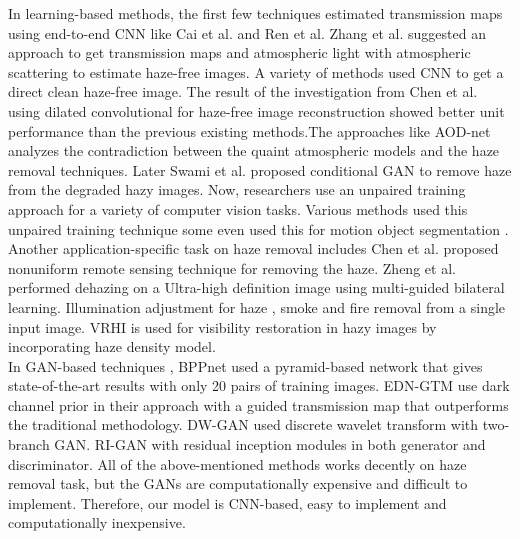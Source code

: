 In learning-based methods, the first few techniques estimated transmission maps using end-to-end CNN like Cai et al.\cite{halo_cai_cnn} and Ren et al. \cite{ren} Zhang et al. \cite{zhang} suggested an approach to get transmission maps and atmospheric light with atmospheric scattering to estimate haze-free images. A variety of methods used CNN \cite{prior_cnn1, cnn_o, obj_det_cnn, halo_cai_cnn} to get a direct clean haze-free image. The result of the investigation from Chen et al. \cite{gated} using dilated convolutional for haze-free image reconstruction showed better unit performance than the previous existing methods.The approaches like AOD-net \cite{aod} analyzes the contradiction between the  quaint atmospheric models and the haze removal techniques. Later Swami et al. \cite{swami} proposed conditional GAN to remove haze from the degraded hazy images. Now, researchers \cite{res_unp, res_unp1} use an unpaired training approach for a variety of computer vision tasks. Various methods used this unpaired training technique some even used this for motion object segmentation \cite{motion_seg_cnn}. Another application-specific task on haze removal includes Chen et al. \cite{non_uniform} proposed nonuniform remote sensing technique for removing the haze. Zheng et al. \cite{uhd} performed dehazing on a Ultra-high definition image   using multi-guided bilateral learning. Illumination adjustment for haze \cite{col_d_ill}, smoke and fire removal from a single input image. VRHI \cite{VRHI} is used for visibility restoration in hazy images by incorporating haze density model. 
\\
In GAN-based techniques \cite{multi_scale_ad}, BPPnet \cite{bppnet_sota} used a pyramid-based network that gives state-of-the-art results with only 20 pairs of training images. EDN-GTM \cite{sec_sota} use dark channel prior in their approach with a guided transmission map that outperforms the traditional methodology. DW-GAN \cite{dw_gan} used discrete wavelet transform with two-branch GAN. RI-GAN \cite{ri_gan} with residual inception modules in both generator and discriminator. All of the above-mentioned methods works decently on haze removal task, but the GANs are computationally expensive and difficult to implement. Therefore, our model is CNN-based, easy to implement and computationally inexpensive.